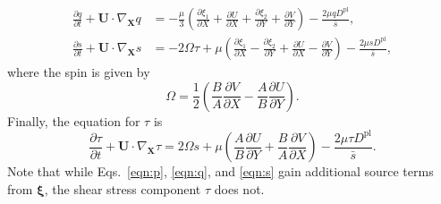 \documentclass[11pt]{article}
\newcommand{\p}{\partial}
\newcommand{\bxi}{\boldsymbol\xi}
\newcommand{\bU}{\mathbf{U}}
\newcommand{\bX}{\mathbf{X}}
\newcommand{\Dpl}{D^\text{pl}}
\begin{document}
\begin{align}
    \label{eqn:q}
    \frac{\p q}{\p t} + \bU\cdot \nabla_\bX q &= -\frac{\mu}{3} \left(\frac{\p \xi_1}{\p X} + \frac{\p U}{\p X} + \frac{\p \xi_2}{\p Y} + \frac{\p V}{\p Y}\right) - \frac{2\mu q \Dpl}{\bar{s}}, \\
    \label{eqn:s}
    \frac{\p s}{\p t} + \bU\cdot \nabla_\bX s &= -2\Omega\tau + \mu \left(\frac{\p \xi_1}{\p X} - \frac{\p \xi_2}{\p Y} + \frac{\p U}{\p X} - \frac{\p V}{\p Y}\right) - \frac{2\mu s \Dpl}{\bar{s}},
\end{align}
where the spin is given by
\begin{equation}
  \Omega = \frac{1}{2}\left(\frac{B}{A}\frac{\p V}{\p X} - \frac{A}{B}\frac{\p U}{\p Y}\right).
    \label{eqn:prob_1_spin}
\end{equation}
Finally, the equation for $\tau$ is
\begin{equation}
    \label{eqn:tau}
    \frac{\p \tau}{\p t} + \bU\cdot \nabla_\bX\tau = 2\Omega s + \mu\left(\frac{A}{B} \frac{\p U}{\p Y} + \frac{B}{A} \frac{\p V}{\p X}\right) - \frac{2\mu\tau \Dpl}{\bar{s}}.
\end{equation}
Note that while Eqs.~\ref{eqn:p}, \ref{eqn:q}, and \ref{eqn:s} gain additional source terms from $\bxi$, the shear stress component $\tau$ does not.
\end{document}

